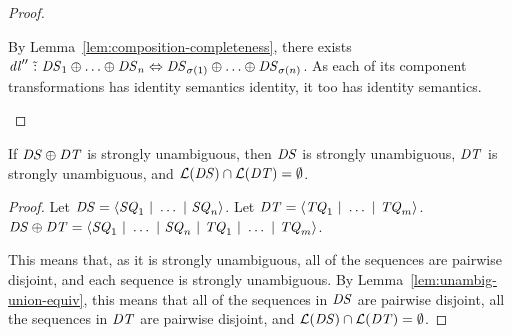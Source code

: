 \documentclass[acmsmall]{acmart}
\begin{document}
\begin{proof}
\begin{case}[$j>0$]
    By Lemma~\ref{lem:composition-completeness},
    there exists $\mathit{dl}'' \,\,\tilde{:}\,\,
    \mathit{DS}_1 \oplus \ldots \oplus \mathit{DS}_n
    \Leftrightarrow
    \mathit{DS}_{\sigma(1)} \oplus \ldots \oplus \mathit{DS}_{\sigma(n)}$.
    As each of its component transformations has identity semantics identity,
    it too has identity semantics.
  \end{case}
\end{proof}

\begin{lemma}
  \label{lem:or-prop-subcomponent}
  If $\mathit{DS} \oplus \mathit{DT}$ is strongly unambiguous, then
  $\mathit{DS}$ is strongly unambiguous, $\mathit{DT}$ is strongly unambiguous,
  and $\mathcal{L}(\mathit{DS}) \cap \mathcal{L}(\mathit{DT}) = \emptyset$.
\end{lemma}
\begin{proof}
  Let $\mathit{DS} = \langle\mathit{SQ}_1 ~|~ \ldots ~|~ \mathit{SQ}_n\rangle$.
  Let $\mathit{DT} = \langle\mathit{TQ}_1 ~|~ \ldots ~|~ \mathit{TQ}_m\rangle$.
  $\mathit{DS} \oplus \mathit{DT} =
  \langle\mathit{SQ}_1 ~|~ \ldots ~|~ \mathit{SQ}_n ~|~ \mathit{TQ}_1 ~|~ \ldots ~|~ \mathit{TQ}_m\rangle$.

  This means that, as it is strongly unambiguous, all of the sequences are
  pairwise disjoint, and each sequence is strongly unambiguous.
  By Lemma~\ref{lem:unambig-union-equiv}, this means that
  all of the sequences in $\mathit{DS}$ are pairwise disjoint, all the sequences
  in $\mathit{DT}$ are pairwise disjoint, and
  $\mathcal{L}(\mathit{DS}) \cap \mathcal{L}(\mathit{DT}) = \emptyset$.
\end{proof}
\end{document}
